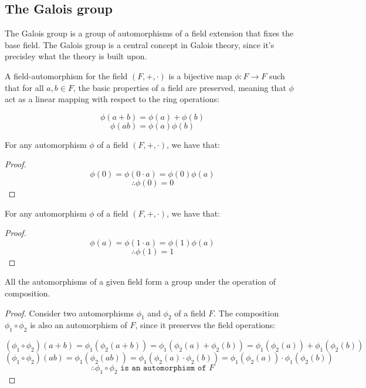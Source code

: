 
\subsection{The Galois group}
The Galois group is a group of automorphisms of a field extension 
that fixes the base field. The Galois group is a central concept in 
Galois theory, since it's precisley what the theory is built upon.

\begin{definition}[Automorphism]
A field-automorphism for the field $(F, +, \cdot)$ is a bijective map 
$\phi: F \to F$ such that for all $a, b \in F$, the basic properties of a field are preserved, 
meaning that $\phi$ act as a linear mapping with respect to the ring operations:

$$ \phi(a + b) = \phi(a) + \phi(b) $$
$$ \phi(ab) = \phi(a)\phi(b) $$ \vspace{0.2em}
\end{definition}

\begin{lemma}
For any automorphism $\phi$ of a field $(F, +, \cdot)$, we have that:
\end{lemma}
\begin{proof}
$$ \phi(0) = \phi(0 \cdot a) = \phi(0) \phi(a) $$
$$ \therefore \phi(0) = 0 $$
\end{proof}


\begin{lemma}
For any automorphism $\phi$ of a field $(F, +, \cdot)$, we have that:
\end{lemma}
\begin{proof}
$$ \phi(a) = \phi(1 \cdot a) = \phi(1) \phi(a) $$
$$ \therefore \phi(1) = 1 $$
\end{proof}

\begin{lemma}
    All the automorphisms of a given field form a group under the operation of composition.
\end{lemma}
\begin{proof}
    Consider two automorphisms $\phi_1$ and $\phi_2$ of a field $F$. The composition
    $\phi_1 \circ \phi_2$ is also an automorphism of $F$, since it preserves the field operations:

    $$ (\phi_1 \circ \phi_2)(a + b) = \phi_1(\phi_2(a + b)) = \phi_1(\phi_2(a) + \phi_2(b)) = \phi_1(\phi_2(a)) + \phi_1(\phi_2(b)) $$
    $$ (\phi_1 \circ \phi_2)(ab) = \phi_1(\phi_2(ab)) = \phi_1(\phi_2(a) \cdot \phi_2(b)) = \phi_1(\phi_2(a)) \cdot \phi_1(\phi_2(b)) $$
    $$ \therefore \phi_1 \circ \phi_2 \texttt{ is an automorphism of } F $$
\end{proof}

